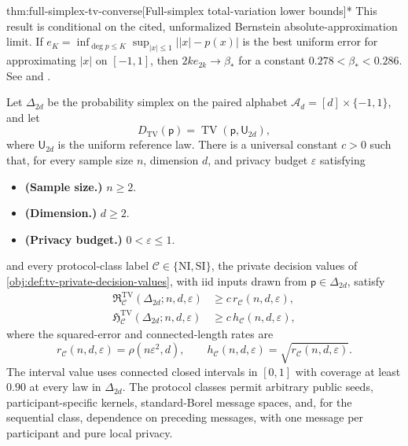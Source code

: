 \documentclass[11pt]{article}
\begin{document}
\begin{theoremv}{thm:full-simplex-tv-converse}[Full-simplex total-variation lower bounds]*
This result is conditional on the cited, unformalized Bernstein absolute-approximation limit. If \(e_K=\inf_{\deg p\le K}\sup_{|x|\le1}\lvert |x|-p(x)\rvert\) is the best uniform error for approximating \(|x|\) on \([-1,1]\), then \(2k e_{2k}\to\beta_*\) for a constant \(0.278<\beta_*<0.286\). See \citet[Section 3.1]{CaiLow2011Nonsmooth} and \citet{Bernstein1913}.

Let \(\Delta_{2d}\) be the probability simplex on the paired alphabet \(\mathcal A_d=[d]\times\{-1,1\}\), and let
\[
D_{\mathrm{TV}}(\mathsf p)=\operatorname{TV}(\mathsf p,\mathsf U_{2d}),
\]
where \(\mathsf U_{2d}\) is the uniform reference law. There is a universal constant \(c>0\) such that, for every sample size \(n\), dimension \(d\), and privacy budget \(\varepsilon\) satisfying
\begin{itemize}
\item \textbf{(Sample size.)} \(n\ge2\).
\item \textbf{(Dimension.)} \(d\ge2\).
\item \textbf{(Privacy budget.)} \(0<\varepsilon\le1\).
\end{itemize}
and every protocol-class label \(\mathcal C\in\{\mathrm{NI},\mathrm{SI}\}\), the private decision values of \cref{obj:def:tv-private-decision-values}, with iid inputs drawn from \(\mathsf p\in\Delta_{2d}\), satisfy
\[
\begin{aligned}
\mathfrak R^{\mathrm{TV}}_{\mathcal C}(\Delta_{2d};n,d,\varepsilon)
&\ge c\,r_{\mathcal C}(n,d,\varepsilon),\\
\mathfrak H^{\mathrm{TV}}_{\mathcal C}(\Delta_{2d};n,d,\varepsilon)
&\ge c\,h_{\mathcal C}(n,d,\varepsilon),
\end{aligned}
\]
where the squared-error and connected-length rates are
\[
r_{\mathcal C}(n,d,\varepsilon)=\rho(n\varepsilon^2,d),
\qquad
h_{\mathcal C}(n,d,\varepsilon)=\sqrt{r_{\mathcal C}(n,d,\varepsilon)}.
\]
The interval value uses connected closed intervals in \([0,1]\) with coverage at least \(0.90\) at every law in \(\Delta_{2d}\). The protocol classes permit arbitrary public seeds, participant-specific kernels, standard-Borel message spaces, and, for the sequential class, dependence on preceding messages, with one message per participant and pure local privacy.
\end{theoremv}
\end{document}
